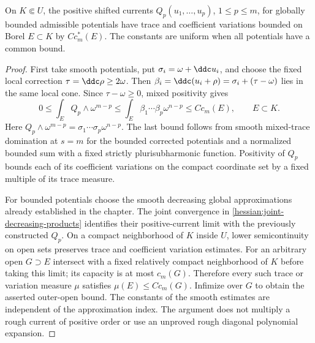 \begin{lemma}\label{draft623:positive-capacity-domination}
On $K\Subset U$, the positive shifted currents
$Q_p(u_1,\ldots,u_p)$, $1\leq p\leq m$, for globally bounded
admissible potentials have trace and coefficient variations bounded
on Borel $E\subset K$ by $C c_m^*(E)$. The constants are uniform
when all potentials have a common bound.
\end{lemma}
\begin{proof}
First take smooth potentials, put $\sigma_i=\omega+\ddc u_i$, and
choose the fixed local correction $\tau=\ddc\rho\geq2\omega$.
Then
$\beta_i=\ddc(u_i+\rho)=\sigma_i+(\tau-\omega)$ lies in the
same local cone. Since $\tau-\omega\geq0$, mixed positivity gives
\[
 0\leq\int_E Q_p\wedge\omega^{m-p}
    \leq\int_E\beta_1\cdots\beta_p\omega^{n-p}
    \leq C c_m(E),\qquad E\subset K.
\]
Here $Q_p\wedge\omega^{m-p}=\sigma_1\cdots\sigma_p\omega^{n-p}$.
The last bound follows from smooth mixed-trace domination at $s=m$
for the bounded corrected potentials and a normalized bounded sum with a fixed strictly
plurisubharmonic function. Positivity of $Q_p$ bounds each of its
coefficient variations on the compact coordinate set by a fixed
multiple of its trace measure.

For bounded potentials choose the smooth decreasing global
approximations already established in the chapter. The joint
convergence in \cref{hessian:joint-decreasing-products} identifies
their positive-current limit with the previously constructed $Q_p$.
On a compact neighborhood of $K$ inside $U$, lower semicontinuity
on open sets preserves trace and coefficient variation estimates.
For an arbitrary open $G\supset E$ intersect with a fixed relatively
compact neighborhood of $K$ before taking this limit; its capacity
is at most $c_m(G)$. Therefore every such trace or variation measure
$\mu$ satisfies $\mu(E)\leq Cc_m(G)$. Infimize over $G$ to obtain
the asserted outer-open bound. The constants of the smooth estimates
are independent of the approximation index. The argument does not
multiply a rough current of positive order or use an unproved rough
diagonal polynomial expansion.
\end{proof}

